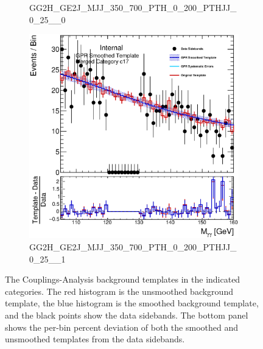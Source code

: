 \begin{figure}
\begin{center}
\begin{subfigure}[T]{0.49\linewidth}
	\caption{\tiny{GG2H\_GE2J\_MJJ\_350\_700\_PTH\_0\_200\_PTHJJ\_0\_25\_\_0}}
\end{subfigure}
\begin{subfigure}[T]{0.49\linewidth}
	\centering
	\includegraphics[width=\linewidth]{figures/background/gpr/coupCatTemplates/GPR_Smoothed_Plot_hmgg_c17.eps}
	\caption{\tiny{GG2H\_GE2J\_MJJ\_350\_700\_PTH\_0\_200\_PTHJJ\_0\_25\_\_1}}
\end{subfigure}
\caption{The Couplings-Analysis background templates in the indicated categories. The red histogram is the unsmoothed background template, the blue histogram is the smoothed background template, and the black points show the data sidebands. The bottom panel shows the per-bin percent deviation of both the smoothed and unsmoothed templates from the data sidebands. }
 \label{fig:gpr_coupcat_4}
 \end{center}
\end{figure}

